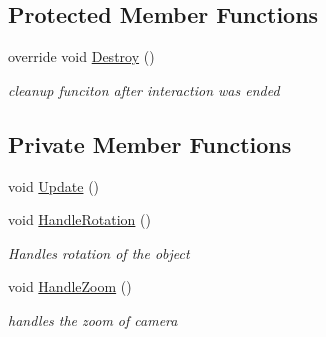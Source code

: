 \subsection*{Protected Member Functions}
\begin{DoxyCompactItemize}
\item 
override void \mbox{\hyperlink{class_object_in_hand_component_a932b69c4977ec0836389b71a6aa1366c}{Destroy}} ()
\begin{DoxyCompactList}\small\item\em cleanup funciton after interaction was ended \end{DoxyCompactList}\end{DoxyCompactItemize}
\subsection*{Private Member Functions}
\begin{DoxyCompactItemize}
\item 
void \mbox{\hyperlink{class_object_in_hand_component_aa3e0ef83a3a10b498b95eb07a405b0e9}{Update}} ()
\item 
void \mbox{\hyperlink{class_object_in_hand_component_aa00e6e5af513b7c24e36e7e74b1f7ae4}{Handle\+Rotation}} ()
\begin{DoxyCompactList}\small\item\em Handles rotation of the object \end{DoxyCompactList}\item 
void \mbox{\hyperlink{class_object_in_hand_component_a01fb8169d53ed7176d1aae0729f7caa1}{Handle\+Zoom}} ()
\begin{DoxyCompactList}\small\item\em handles the zoom of camera \end{DoxyCompactList}\end{DoxyCompactItemize}
